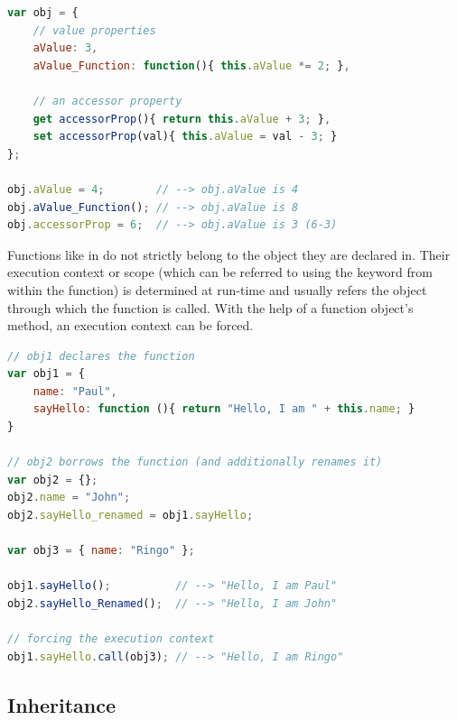 \SingleSpacing
\begin{lstlisting}[language=JavaScript, caption=Properties in \myProperName{JavaScript}, label=JSTypes]
var obj = {
	// value properties
	aValue: 3,
	aValue_Function: function(){ this.aValue *= 2; },
	
	// an accessor property
	get accessorProp(){ return this.aValue + 3; },
	set accessorProp(val){ this.aValue = val - 3; }
};

obj.aValue = 4;        // --> obj.aValue is 4
obj.aValue_Function(); // --> obj.aValue is 8
obj.accessorProp = 6;  // --> obj.aValue is 3 (6-3)
\end{lstlisting}
\OnehalfSpacing

Functions like  in  do not strictly belong to the object they are declared in. Their execution context or scope (which can be referred to using the  keyword from within the function) is determined at run-time and usually refers the object through which the function is called. With the help of a function object's  method, an execution context can be forced.

\SingleSpacing
\begin{lstlisting}[language=JavaScript, caption=Execution context of functions]
// obj1 declares the function
var obj1 = {
	name: "Paul",
	sayHello: function (){ return "Hello, I am " + this.name; }
}

// obj2 borrows the function (and additionally renames it)
var obj2 = {};
obj2.name = "John";
obj2.sayHello_renamed = obj1.sayHello; 

var obj3 = { name: "Ringo" };

obj1.sayHello();          // --> "Hello, I am Paul"
obj2.sayHello_Renamed();  // --> "Hello, I am John"

// forcing the execution context
obj1.sayHello.call(obj3); // --> "Hello, I am Ringo"

\end{lstlisting}
\OnehalfSpacing

\subsection{Inheritance}
\label{sec:JSInheritance}

